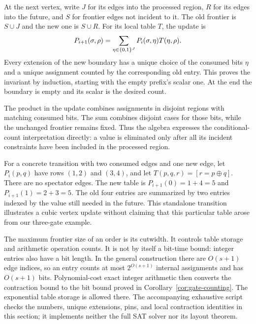 At the next vertex, write $J$ for its edges into the processed region,
$R$ for its edges into the future, and $S$ for frontier edges not incident
to it. The old frontier is $S\cup J$ and the new one is $S\cup R$.
For its local table $T$, the update is
\begin{equation}\label{eq:walk-frontier}
 P_{i+1}(\sigma,\rho)=
 \sum_{\eta\in\{0,1\}^J}P_i(\sigma,\eta)T(\eta,\rho).
\end{equation}
Every extension of the new boundary has a unique choice of the consumed
bits $\eta$ and a unique assignment counted by the corresponding old
entry. This proves the invariant by induction, starting with the empty
prefix's scalar one. At the end the boundary is empty and its scalar is
the desired count.

The product in the update combines assignments in disjoint regions with
matching consumed bits. The sum combines disjoint cases for those bits,
while the unchanged frontier remains fixed. Thus the algebra expresses
the conditional-count interpretation directly: a value is eliminated
only after all its incident constraints have been included in the
processed region.

For a concrete transition with two consumed edges and one new edge,
let $P_i(p,q)$ have rows $(1,2)$ and $(3,4)$, and let
$T(p,q,r)=[r=p\oplus q]$. There are no spectator edges. The new table is
$P_{i+1}(0)=1+4=5$ and $P_{i+1}(1)=2+3=5$. The old four entries are
summarized by two entries indexed by the value still needed in the future.
This standalone transition illustrates a cubic vertex update without
claiming that this particular table arose from our three-gate example.

The maximum frontier size of an order is its cutwidth. It controls table
storage and arithmetic operation counts. It is not by itself a bit-time
bound: integer entries also have a bit length. In the general construction
there are $O(s+1)$ edge indices, so an entry counts at most
$2^{O(s+1)}$ internal assignments and has $O(s+1)$ bits. Polynomial-cost
exact integer arithmetic then converts the contraction bound to the bit
bound proved in Corollary~\ref{cor:gate-counting}. The exponential table
storage is allowed there. The accompanying exhaustive script checks the
numbers, unique extensions, pins, and local contraction identities in this
section; it implements neither the full SAT solver nor its layout theorem.
